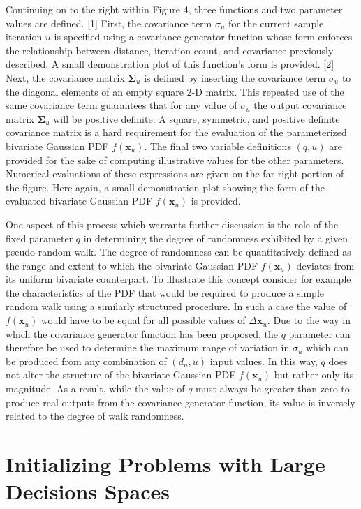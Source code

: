 Continuing on to the right within Figure 4, three functions and two parameter values are defined. [1] First, the covariance term $\sigma_u$ for the current sample iteration $u$ is specified using a covariance generator function whose form enforces the relationship between distance, iteration count, and covariance previously described. A small demonstration plot of this function's form is provided. [2] Next, the covariance matrix $\boldsymbol\Sigma_u$ is defined by inserting the covariance term $\sigma_u$ to the diagonal elements of an empty square 2-D matrix. This repeated use of the same covariance term guarantees that for any value of $\sigma_u$ the output covariance matrix $\boldsymbol\Sigma_u$ will be positive definite. A square, symmetric, and positive definite covariance matrix is a hard requirement for the evaluation of the parameterized bivariate Gaussian PDF $f(\textbf{x}_u)$. The final two variable definitions $(q,u)$ are provided for the sake of computing illustrative values for the other parameters. Numerical evaluations of these expressions are given on the far right portion of the figure. Here again, a small demonstration plot showing the form of the evaluated bivariate Gaussian PDF $f(\textbf{x}_u)$ is provided.

One aspect of this process which warrants further discussion is the role of the fixed parameter $q$ in determining the degree of randomness exhibited by a given pseudo-random walk. The degree of randomness can be quantitatively defined as the range and extent to which the bivariate Gaussian PDF $f(\textbf{x}_u)$ deviates from its uniform bivariate counterpart. To illustrate this concept consider for example the characteristics of the PDF that would be required to produce a simple random walk using a similarly structured procedure. In such a case the value of $f(\textbf{x}_u)$ would have to be equal for all possible values of $\Delta\textbf{x}_u$. Due to the way in which the covariance generator function has been proposed, the $q$ parameter can therefore be used to determine the maximum range of variation in $\sigma_u$ which can be produced from any combination of $(d_n,u)$ input values. In this way, $q$ does not alter the structure of the bivariate Gaussian PDF $f(\textbf{x}_u)$ but rather only its magnitude. As a result, while the value of $q$ must always be greater than zero to produce real outputs from the covariance generator function, its value is inversely related to the degree of walk randomness. 

\section{Initializing Problems with Large Decisions Spaces}
    
